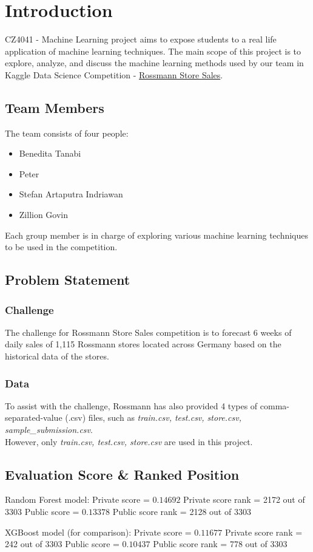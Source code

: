 \chapter{Introduction}
CZ4041 - Machine Learning project aims to expose students to a real life application of machine learning techniques. The main scope of this project is to explore, analyze, and discuss the machine learning methods used by our team in Kaggle Data Science Competition - \href{https://www.kaggle.com/c/rossmann-store-sales}{Rossmann Store Sales}.


\section{Team Members}
The team consists of four people:
\begin{itemize}
	\item Benedita Tanabi
	\item Peter
	\item Stefan Artaputra Indriawan
	\item Zillion Govin
\end{itemize}
Each group member is in charge of exploring various machine learning techniques to be used in the competition.

\section{Problem Statement}

\subsection{Challenge}
The challenge for Rossmann Store Sales competition is to forecast 6 weeks of daily sales of 1,115 Rossmann stores located across Germany based on the historical data of the stores.

\subsection{Data}
To assist with the challenge, Rossmann has also provided 4 types of comma-separated-value (.csv) files, such as \textit{train.csv, test.csv, store.csv, sample\_submission.csv}.\\
However, only \textit{train.csv, test.csv, store.csv} are used in this project.

\section{Evaluation Score & Ranked Position}
Random Forest model:
Private score = $0.14692$
Private score rank = 2172 out of 3303
Public score = $0.13378$
Public score rank = 2128 out of 3303

XGBoost model (for comparison):
Private score = $0.11677$
Private score rank = 242 out of 3303
Public score = $0.10437$
Public score rank = 778 out of 3303

